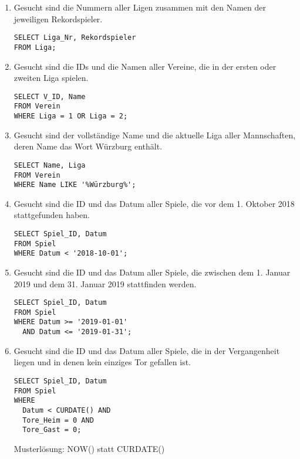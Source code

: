 \documentclass{lehramt-informatik-aufgabe}
\begin{document}
\begin{enumerate}
\item Gesucht sind die Nummern aller Ligen zusammen mit den Namen der
jeweiligen Rekordspieler.

\begin{verbatim}
SELECT Liga_Nr, Rekordspieler
FROM Liga;
\end{verbatim}


\item Gesucht sind die IDs und die Namen aller Vereine, die in der
ersten oder zweiten Liga spielen.

\begin{verbatim}
SELECT V_ID, Name
FROM Verein
WHERE Liga = 1 OR Liga = 2;
\end{verbatim}

%

\item Gesucht sind der vollständige Name und die aktuelle Liga aller
Mannschaften, deren Name das Wort Würzburg enthält.

\begin{verbatim}
SELECT Name, Liga
FROM Verein
WHERE Name LIKE '%Würzburg%';
\end{verbatim}

%

\item Gesucht sind die ID und das Datum aller Spiele, die vor dem 1.
Oktober 2018 stattgefunden haben.

\begin{verbatim}
SELECT Spiel_ID, Datum
FROM Spiel
WHERE Datum < '2018-10-01';
\end{verbatim}

%

\item Gesucht sind die ID und das Datum aller Spiele, die zwischen
dem 1. Januar 2019 und dem 31. Januar 2019 stattfinden werden.

\begin{verbatim}
SELECT Spiel_ID, Datum
FROM Spiel
WHERE Datum >= '2019-01-01'
  AND Datum <= '2019-01-31';
\end{verbatim}

%

\item Gesucht sind die ID und das Datum aller Spiele, die in der
Vergangenheit liegen und in denen kein einziges Tor gefallen ist.

\begin{verbatim}
SELECT Spiel_ID, Datum
FROM Spiel
WHERE
  Datum < CURDATE() AND
  Tore_Heim = 0 AND
  Tore_Gast = 0;
\end{verbatim}

Musterlösung: NOW() statt CURDATE()

\end{enumerate}
\end{document}
